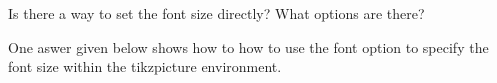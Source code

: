 Is there a way to set the font size directly? What options are there?

One aswer given below shows how to how to use the font option to specify the font size within the tikzpicture environment.



\cite{ariola-herbelin}
\label{chap:dependent-types}






































































